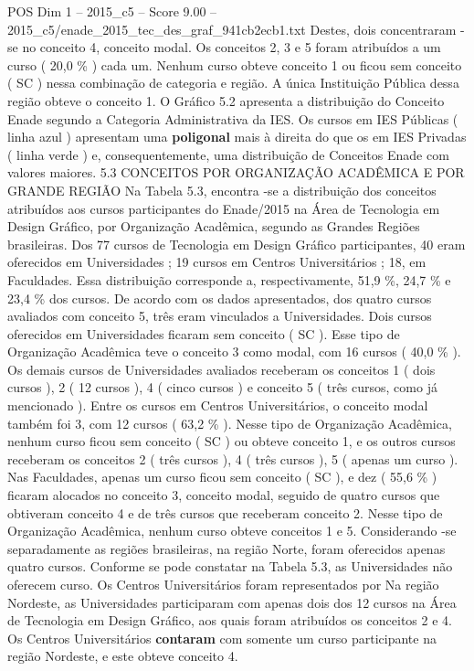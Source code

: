\begin{textsample}{POS Dim 1 – 2015\_c5 – Score 9.00 – 2015\_c5/enade\_2015\_tec\_des\_graf\_941cb2ecb1.txt}
Destes, dois concentraram -se no conceito 4, conceito modal.
Os conceitos 2, 3 e 5 foram atribuídos a um curso ( 20,0 \% ) cada um.
Nenhum curso obteve conceito 1 ou ficou sem conceito ( SC ) nessa combinação de categoria e região.
A única Instituição Pública dessa região obteve o conceito 1.
O Gráfico 5.2 apresenta a distribuição do Conceito Enade segundo a Categoria Administrativa da IES.
Os cursos em IES Públicas ( linha azul ) apresentam uma \textbf{poligonal} mais à direita do que os em IES Privadas ( linha verde ) e, consequentemente, uma distribuição de Conceitos Enade com valores maiores. 5.3 CONCEITOS POR ORGANIZAÇÃO ACADÊMICA E POR GRANDE REGIÃO Na Tabela 5.3, encontra -se a distribuição dos conceitos atribuídos aos cursos participantes do Enade/2015 na Área de Tecnologia em Design Gráfico, por Organização Acadêmica, segundo as Grandes Regiões brasileiras.
Dos 77 cursos de Tecnologia em Design Gráfico participantes, 40 eram oferecidos em Universidades ; 19 cursos em Centros Universitários ; 18, em Faculdades.
Essa distribuição corresponde a, respectivamente, 51,9 \%, 24,7 \% e 23,4 \% dos cursos.
De acordo com os dados apresentados, dos quatro cursos avaliados com conceito 5, três eram vinculados a Universidades.
Dois cursos oferecidos em Universidades ficaram sem conceito ( SC ).
Esse tipo de Organização Acadêmica teve o conceito 3 como modal, com 16 cursos ( 40,0 \% ).
Os demais cursos de Universidades avaliados receberam os conceitos 1 ( dois cursos ), 2 ( 12 cursos ), 4 ( cinco cursos ) e conceito 5 ( três cursos, como já mencionado ).
Entre os cursos em Centros Universitários, o conceito modal também foi 3, com 12 cursos ( 63,2 \% ).
Nesse tipo de Organização Acadêmica, nenhum curso ficou sem conceito ( SC ) ou obteve conceito 1, e os outros cursos receberam os conceitos 2 ( três cursos ), 4 ( três cursos ), 5 ( apenas um curso ).
Nas Faculdades, apenas um curso ficou sem conceito ( SC ), e dez ( 55,6 \% ) ficaram alocados no conceito 3, conceito modal, seguido de quatro cursos que obtiveram conceito 4 e de três cursos que receberam conceito 2.
Nesse tipo de Organização Acadêmica, nenhum curso obteve conceitos 1 e 5.
Considerando -se separadamente as regiões brasileiras, na região Norte, foram oferecidos apenas quatro cursos.
Conforme se pode constatar na Tabela 5.3, as Universidades não oferecem curso.
Os Centros Universitários foram representados por Na região Nordeste, as Universidades participaram com apenas dois dos 12 cursos na Área de Tecnologia em Design Gráfico, aos quais foram atribuídos os conceitos 2 e 4.
Os Centros Universitários \textbf{contaram} com somente um curso participante na região Nordeste, e este obteve conceito 4.

\end{textsample}
